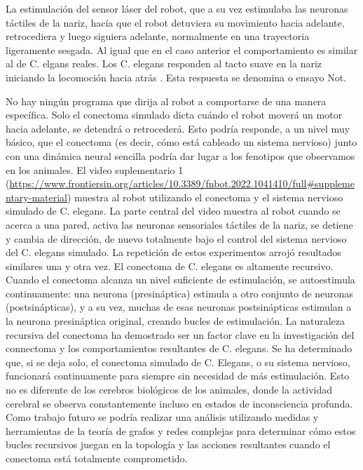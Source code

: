 La estimulación del sensor láser  del robot, que a su vez estimulaba las neuronas táctiles de la nariz, hacía que el robot detuviera su movimiento hacia adelante, retrocediera y luego siguiera adelante, normalmente en una trayectoria ligeramente sesgada.  Al igual que en el caso anterior el comportamiento es similar al de C. elgans reales. Los  C. elegans responden al tacto suave en la nariz iniciando la locomoción hacia atrás \cite{chalfie_assaying_2018,chalfie_neural_1985}. Esta respuesta se denomina  o ensayo Not.  

No hay ningún programa que dirija al robot a comportarse de una manera específica. Solo el conectoma simulado dicta cuándo el robot moverá un motor hacia adelante, se detendrá o retrocederá. Esto podría responde, a un nivel muy básico, que el conectoma (es decir, cómo está cableado un sistema nervioso)  junto con una dinámica neural sencilla  podría dar lugar a los fenotipos que observamos en los animales. El  video suplementario 1 (\url{https://www.frontiersin.org/articles/10.3389/fnbot.2022.1041410/full#supplementary-material}) muestra al robot utilizando el conectoma y el sistema nervioso simulado de C. elegans.  La parte central del video muestra al robot cuando se acerca a una pared, activa las neuronas sensoriales táctiles de la nariz, se detiene y cambia de dirección, de nuevo totalmente bajo el control del sistema nervioso del C. elegans simulado. La repetición de estos experimentos arrojó resultados similares una y otra vez. El conectoma de C. elegans es altamente recursivo. Cuando el conectoma alcanza un nivel suficiente de estimulación, se autoestimula continuamente: una neurona (presináptica) estimula a otro conjunto de neuronas (postsinápticas), y a su vez, muchas de esas neuronas postsinápticas estimulan a la neurona presináptica original, creando bucles de estimulación. La naturaleza recursiva del conectoma ha demostrado ser un factor clave en la investigación del connectoma y los comportamientos resultantes de C. elegans. Se ha determinado que, si se deja solo, el conectoma simulado de C. Elegans, o su sistema nervioso, funcionará continuamente para siempre sin necesidad de más estimulación. Esto no es diferente de los cerebros biológicos de los animales, donde la actividad cerebral se observa constantemente incluso en estados de inconsciencia profunda. Como trabajo futuro se podría realizar una análisis utilizando medidas y herramientas de la teoría de grafos y  redes complejas  para determinar cómo estos bucles recursivos juegan en la topología y las acciones resultantes cuando el conectoma está totalmente comprometido.


